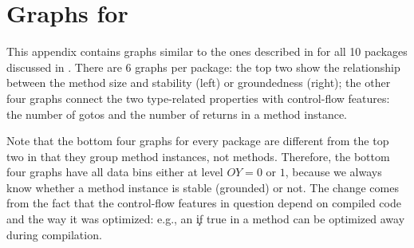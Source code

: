 
\appendix

\chapter{Graphs for }\label{sec:app}

This appendix contains graphs similar to the ones described in
 for all 10 packages discussed in .
There are 6 graphs per package: the top two show the relationship between the
method size and stability (left) or groundedness (right); the other four graphs
connect the two type-related properties with control-flow features: the number
of gotos and the number of returns in a method instance.

Note that the bottom four graphs for every package are different from the top
two in that they group method instances, not methods. Therefore,
the bottom four graphs have all data bins either at level $OY=0$ or $1$, because
we always know whether a method instance is stable (grounded) or not.
The change comes from the fact that the control-flow features in question
depend on compiled code and the way it was optimized: e.\;g., an \c{if true} in a
method can be optimized away during compilation.

\clearpage


